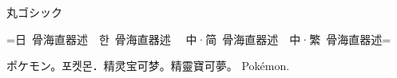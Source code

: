\documentclass[dvipdfmx,landscape]{utarticle}
\begin{document}
{\mgfamily
  {\mdseries
    丸ゴシック\par
    =日~骨海直器述~~\foreignlanguage{korean}{한~骨海直器述}%
    ~~\foreignlanguage{schinese}{中·简~骨海直器述}~~\foreignlanguage{tchinese}{中·繁~骨海直器述}=\par
    ポケモン。\foreignlanguage{korean}{포켓몬．}\foreignlanguage{schinese}{精灵宝可梦。}\foreignlanguage{tchinese}{精靈寶可夢。} Pokémon.
    \par}}
\end{document}
